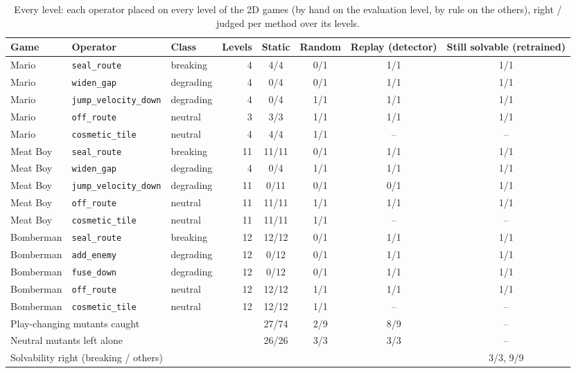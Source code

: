 \begin{table}[t]\centering\small
\caption{Every level: each operator placed on every level of the 2D games (by hand on the evaluation level, by rule on the others), right / judged per method over its levels.}
\label{tab:detection-levels}
\begin{tabular}{lllrcccc}\toprule
Game & Operator & Class & Levels & Static & Random & Replay (detector) & Still solvable (retrained) \\\midrule
Mario & \texttt{seal\_route} & breaking & 4 & 4/4 & 0/1 & 1/1 & 1/1 \\
Mario & \texttt{widen\_gap} & degrading & 4 & 0/4 & 0/1 & 1/1 & 1/1 \\
Mario & \texttt{jump\_velocity\_down} & degrading & 4 & 0/4 & 1/1 & 1/1 & 1/1 \\
Mario & \texttt{off\_route} & neutral & 3 & 3/3 & 1/1 & 1/1 & 1/1 \\
Mario & \texttt{cosmetic\_tile} & neutral & 4 & 4/4 & 1/1 & -- & -- \\
Meat Boy & \texttt{seal\_route} & breaking & 11 & 11/11 & 0/1 & 1/1 & 1/1 \\
Meat Boy & \texttt{widen\_gap} & degrading & 4 & 0/4 & 1/1 & 1/1 & 1/1 \\
Meat Boy & \texttt{jump\_velocity\_down} & degrading & 11 & 0/11 & 0/1 & 0/1 & 1/1 \\
Meat Boy & \texttt{off\_route} & neutral & 11 & 11/11 & 1/1 & 1/1 & 1/1 \\
Meat Boy & \texttt{cosmetic\_tile} & neutral & 11 & 11/11 & 1/1 & -- & -- \\
Bomberman & \texttt{seal\_route} & breaking & 12 & 12/12 & 0/1 & 1/1 & 1/1 \\
Bomberman & \texttt{add\_enemy} & degrading & 12 & 0/12 & 0/1 & 1/1 & 1/1 \\
Bomberman & \texttt{fuse\_down} & degrading & 12 & 0/12 & 0/1 & 1/1 & 1/1 \\
Bomberman & \texttt{off\_route} & neutral & 12 & 12/12 & 1/1 & 1/1 & 1/1 \\
Bomberman & \texttt{cosmetic\_tile} & neutral & 12 & 12/12 & 1/1 & -- & -- \\
\midrule
\multicolumn{4}{l}{Play-changing mutants caught} & 27/74 & 2/9 & 8/9 & -- \\
\multicolumn{4}{l}{Neutral mutants left alone} & 26/26 & 3/3 & 3/3 & -- \\
\multicolumn{4}{l}{Solvability right (breaking / others)} & & & & 3/3, 9/9 \\
\bottomrule
\end{tabular}
\end{table}
